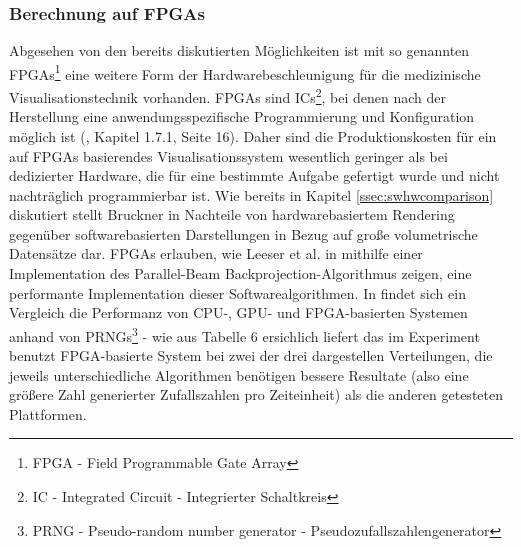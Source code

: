\documentclass[a4paper,titlepage,12pt]{scrartcl}
\newtheorem[L]{boxedDefinition}{Definition}
\begin{document}
\subsubsection{Berechnung auf FPGAs}\label{sssec:fpgacalculation}
Abgesehen von den bereits diskutierten Möglichkeiten ist mit so genannten FPGAs\footnote{FPGA - Field Programmable Gate Array} eine weitere Form der Hardwarebeschleunigung für die medizinische Visualisationstechnik vorhanden. FPGAs sind ICs\footnote{IC - Integrated Circuit - Integrierter Schaltkreis}, bei denen nach der Herstellung eine anwendungsspezifische Programmierung und Konfiguration möglich ist (\cite{Kibritev2009}, Kapitel 1.7.1, Seite 16). Daher sind die Produktionskosten für ein auf FPGAs basierendes Visualisationssystem wesentlich geringer als bei dedizierter Hardware, die für eine bestimmte Aufgabe gefertigt wurde und nicht nachträglich programmierbar ist. Wie bereits in Kapitel \vref{ssec:swhwcomparison} diskutiert stellt Bruckner in \cite{Bruckner2004} Nachteile von hardwarebasiertem Rendering gegenüber softwarebasierten Darstellungen in Bezug auf große volumetrische Datensätze dar. FPGAs erlauben, wie Leeser et al. in \cite{Leeser2005} mithilfe einer Implementation des Parallel-Beam Backprojection-Algorithmus zeigen, eine performante Implementation dieser Softwarealgorithmen. In \cite{Thomas2009} findet sich ein Vergleich die Performanz von CPU-, GPU- und FPGA-basierten Systemen anhand von PRNGs\footnote{PRNG - Pseudo-random number generator - Pseudozufallszahlengenerator} - wie aus Tabelle 6 ersichlich liefert das im Experiment benutzt FPGA-basierte System bei zwei der drei dargestellen Verteilungen, die jeweils unterschiedliche Algorithmen benötigen bessere Resultate (also eine größere Zahl generierter Zufallszahlen pro Zeiteinheit) als die anderen getesteten Plattformen.
\end{document}
